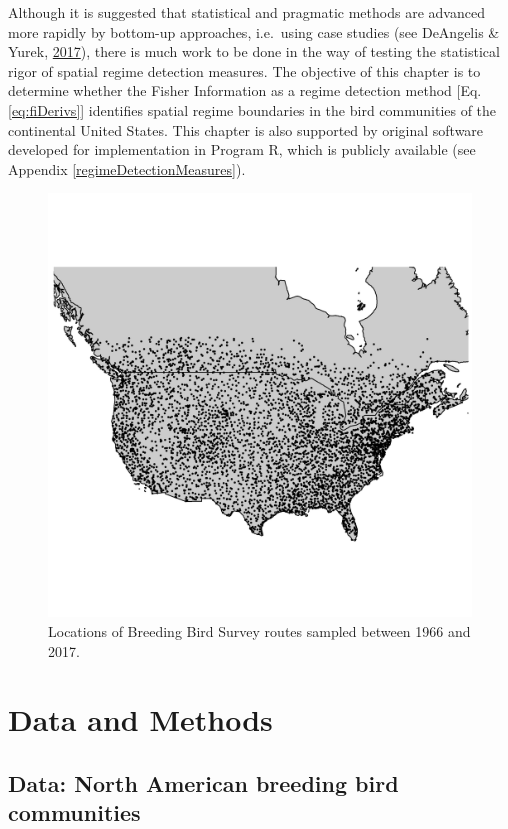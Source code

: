 \documentclass[12pt,twoside,openany]{reedthesis}
\begin{document}
Although it is suggested that statistical and pragmatic methods are advanced more rapidly by bottom-up approaches, i.e.~using case studies (see DeAngelis \& Yurek, \protect\hyperlink{ref-deangelis2017spatially}{2017}), there is much work to be done in the way of testing the statistical rigor of spatial regime detection measures. The objective of this chapter is to determine whether the Fisher Information as a regime detection method {[}Eq. \eqref{eq:fiDerivs}{]} identifies spatial regime boundaries in the bird communities of the continental United States. This chapter is also supported by original software developed for implementation in Program R, which is publicly available (see Appendix \ref{regimeDetectionMeasures}).
\begin{figure}
\includegraphics[width=0.85\linewidth]{./chapterFiles/fisherSpatial/figures/figsCalledInDiss/bbsRoutesUsed} \caption{Locations of Breeding Bird Survey routes sampled between 1966 and 2017.}\label{fig:bbsPoints}
\end{figure}
\hypertarget{data-and-methods}{%
\section{Data and Methods}\label{data-and-methods}}

\hypertarget{data-north-american-breeding-bird-communities}{%
\subsection{Data: North American breeding bird communities}\label{data-north-american-breeding-bird-communities}}
\end{document}

